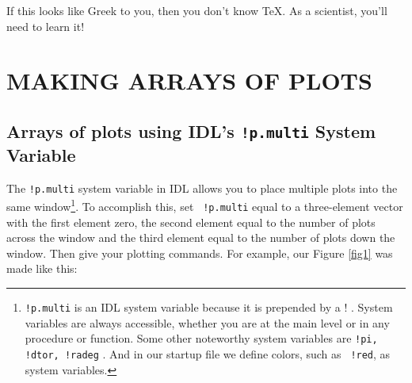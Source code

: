 \documentclass[psfig,preprint]{aastex}
\begin{document}
\noindent If this looks like Greek to you, then you don't know
\TeX. As a scientist, you'll need to learn it!
 
\section{MAKING ARRAYS OF PLOTS}

\subsection{Arrays of plots using IDL's {\tt !p.multi} System Variable}\label{pmulti}

The {\tt !p.multi} system variable in IDL allows you to place multiple
plots into the same window\footnote{{\tt !p.multi} is an IDL system
  variable because it is prepended by a ! . System variables are always
  accessible, whether you are at the main level or in any procedure or
  function. Some other noteworthy system variables are {\tt !pi, !dtor,
    !radeg} . And in our startup file we define colors, such as {\tt
    !red}, as system variables. }.  To accomplish this, set {\tt
  !p.multi} equal to a three-element vector with the first element zero,
the second element equal to the number of plots across the window and
the third element equal to the number of plots down the window.  Then
give your plotting commands.  For example, our Figure \ref{fig1} was
made like this:
\end{document}
